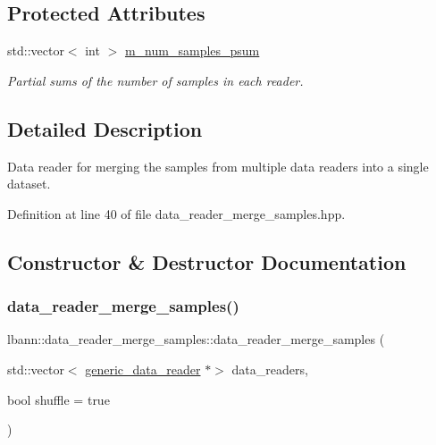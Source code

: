 \subsection*{Protected Attributes}
\begin{DoxyCompactItemize}
\item 
std\+::vector$<$ int $>$ \hyperlink{classlbann_1_1data__reader__merge__samples_afd297d61c11bb6b0d03ce64836bd1300}{m\+\_\+num\+\_\+samples\+\_\+psum}
\begin{DoxyCompactList}\small\item\em Partial sums of the number of samples in each reader. \end{DoxyCompactList}\end{DoxyCompactItemize}


\subsection{Detailed Description}
Data reader for merging the samples from multiple data readers into a single dataset. 

Definition at line 40 of file data\+\_\+reader\+\_\+merge\+\_\+samples.\+hpp.



\subsection{Constructor \& Destructor Documentation}
\mbox{\label{classlbann_1_1data__reader__merge__samples_a01ff9ff7827030da41f1f6d257551260}} 
\subsubsection{\texorpdfstring{data\+\_\+reader\+\_\+merge\+\_\+samples()}{data\_reader\_merge\_samples()}\hspace{0.1cm}{\footnotesize\ttfamily [1/2]}}
{\footnotesize\ttfamily lbann\+::data\+\_\+reader\+\_\+merge\+\_\+samples\+::data\+\_\+reader\+\_\+merge\+\_\+samples (\begin{DoxyParamCaption}\item[{std\+::vector$<$ \hyperlink{classlbann_1_1generic__data__reader}{generic\+\_\+data\+\_\+reader} $\ast$$>$}]{data\+\_\+readers,  }\item[{bool}]{shuffle = {\ttfamily true} }\end{DoxyParamCaption})}



